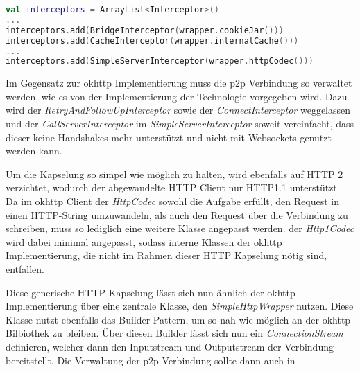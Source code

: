         \begin{lstlisting}[frame=bt, label={lst:android:okhttpchanges}, language=Kotlin, caption=Änderungen an okhttp (Clientcode in Kotlin)]
val interceptors = ArrayList<Interceptor>()
...
interceptors.add(BridgeInterceptor(wrapper.cookieJar()))
interceptors.add(CacheInterceptor(wrapper.internalCache()))
...
interceptors.add(SimpleServerInterceptor(wrapper.httpCodec()))
        \end{lstlisting}
        Im Gegensatz zur okhttp Implementierung muss die p2p Verbindung so verwaltet werden, wie es von der Implementierung der Technologie vorgegeben wird. Dazu wird der {\it RetryAndFollowUpInterceptor} sowie der {\it ConnectInterceptor} weggelassen und der {\it CallServerInterceptor} im {\it SimpleServerInterceptor} soweit vereinfacht, dass dieser keine Handshakes mehr unterstützt und nicht mit Websockets genutzt werden kann.
        
        Um die Kapselung so simpel wie möglich zu halten, wird ebenfalls auf HTTP 2 verzichtet, wodurch der abgewandelte HTTP Client nur HTTP1.1 unterstützt. Da im okhttp Client der {\it HttpCodec} sowohl die Aufgabe erfüllt, den Request in einen HTTP-String umzuwandeln, als auch den Request über die Verbindung zu schreiben, muss so lediglich eine weitere Klasse angepasst werden. der {\it Http1Codec} wird dabei minimal angepasst, sodass interne Klassen der okhttp Implementierung, die nicht im Rahmen dieser HTTP Kapselung nötig sind, entfallen.
                
        Diese generische HTTP Kapselung lässt sich nun ähnlich der okhttp Implementierung über eine zentrale Klasse, den {\it SimpleHttpWrapper} nutzen. Diese Klasse nutzt ebenfalls das Builder-Pattern, um so nah wie möglich an der okhttp Bilbiothek zu bleiben. Über diesen Builder lässt sich nun ein {\it ConnectionStream} definieren, welcher dann den Inputstream und Outputstream der Verbindung bereitstellt. Die Verwaltung der p2p Verbindung sollte dann auch in
        
